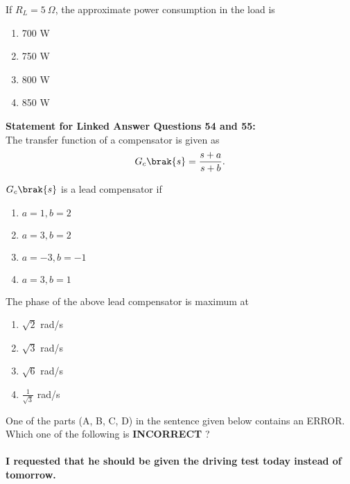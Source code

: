 \iffalse
\chapter{2012}
\author{AI24BTECH11009}
\section{ee}
\fi

\item If $R_L = 5\ \Omega$, the approximate power consumption in the load is 
    \begin{enumerate}
      \item 700 W
      \item 750 W
      \item 800 W
      \item 850 W \\
    \end{enumerate}
\textbf{Statement for Linked Answer Questions 54 and 55:}\\
The transfer function of a compensator is given as
\begin{align*}
    G_c\brak{s} = \frac{s+a}{s+b}.
\end{align*}
\item $G_c\brak{s}$ is a lead compensator if 
\begin{enumerate}
    \item $a = 1, b = 2$
    \item $a = 3, b = 2$
    \item $a = -3, b = -1$
    \item $a = 3, b = 1$ \\
\end{enumerate}
\item The phase of the above lead compensator is maximum at
\begin{enumerate}
    \item $\sqrt{2}$ rad/s
    \item $\sqrt{3}$ rad/s
    \item $\sqrt{6}$ rad/s
    \item $\frac{1}{\sqrt{3}}$ rad/s \\
\end{enumerate}
\item One of the parts (A, B, C, D) in the sentence given below contains an ERROR. Which one of the following is \textbf{INCORRECT} ?\\\\
\textbf{I requested that he should be given the driving test today instead of tomorrow.}
